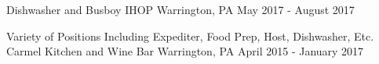 
\vspace{-1mm}
\begin{cventries}

  \cventrywork
    {Dishwasher and Busboy} %
    {IHOP} %
    {Warrington, PA} %
    {May 2017 - August 2017} %

  \vspace{0mm}

  \cventrywork
    {Variety of Positions Including Expediter, Food Prep, Host, Dishwasher, Etc. } %
    {Carmel Kitchen and Wine Bar} %
    {Warrington, PA} %
    {April 2015 - January 2017} %
    
  \vspace{-5mm}

\end{cventries}
